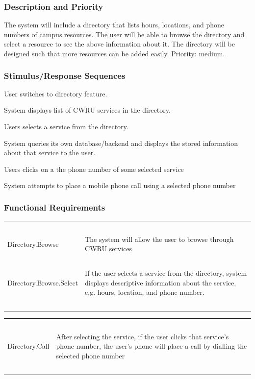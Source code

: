 \documentclass[pdftex,12pt,letter]{article}
\begin{document}
\subsubsection{Description and Priority}
The system will include a directory that lists hours, locations, and phone numbers of campus resources. The user will be able to browse the directory and select a resource to see the above information about it. The directory will be designed such that more resources can be added easily. Priority: medium.
\subsubsection{Stimulus/Response Sequences}
\begin{description}\itemsep1pt
\item[Stimulus:] User switches to directory feature.
\item[Response:] System displays list of CWRU services in the directory.
\item[Stimulus:] Users selects a service from the directory.
\item[Response:] System queries its own database/backend and displays the stored information about that service to the user.
\item[Stimulus:] Users clicks on a the phone number of some selected service
\item[Response:] System attempts to place a mobile phone call using a selected phone number
\end{description}
\subsubsection{Functional Requirements}
\begin{table}[!h]
\begin{tabularx}{\textwidth }[t]{|l Y|}
\hline
~&~\\
Directory.Browse & The system will allow the user to browse through CWRU services\\ 
~&~\\
Directory.Browse.Select & If the user selects a service from the directory, system displays descriptive information about the service, e.g. hours. location, and phone number.\\
~&~\\
\hline
\end{tabularx}
\end{table}
\begin{table}[!h]
\begin{tabularx}{\textwidth }[t]{|l Y|}
\hline
~&~\\
Directory.Call & After selecting the service, if the user clicks that service's phone number, the user's phone will place a call by dialling the selected phone number\\
~&~\\
\hline
\end{tabularx}
\end{table}
\FloatBarrier
\end{document}
